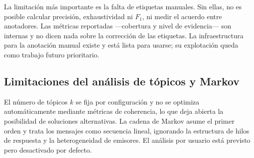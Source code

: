La limitaci\'on m\'as importante es la falta de etiquetas manuales. Sin ellas, no es
posible calcular precisi\'on, exhaustividad ni $F_1$, ni medir el acuerdo entre
anotadores. Las m\'etricas reportadas ---cobertura y nivel de evidencia--- son internas y
no dicen nada sobre la correcci\'on de las etiquetas. La infraestructura para la
anotaci\'on manual existe y est\'a lista para usarse; su explotaci\'on queda como trabajo
futuro prioritario.

\subsection{Limitaciones del an\'alisis de tópicos y Markov}

El n\'umero de tópicos $k$ se fija por configuraci\'on y no se optimiza autom\'aticamente
mediante m\'etricas de coherencia, lo que deja abierta la posibilidad de soluciones
alternativas. La cadena de Markov asume el primer orden y trata los mensajes como
secuencia lineal, ignorando la estructura de hilos de respuesta y la heterogeneidad de
emisores. El an\'alisis por usuario est\'a previsto pero desactivado por defecto.
